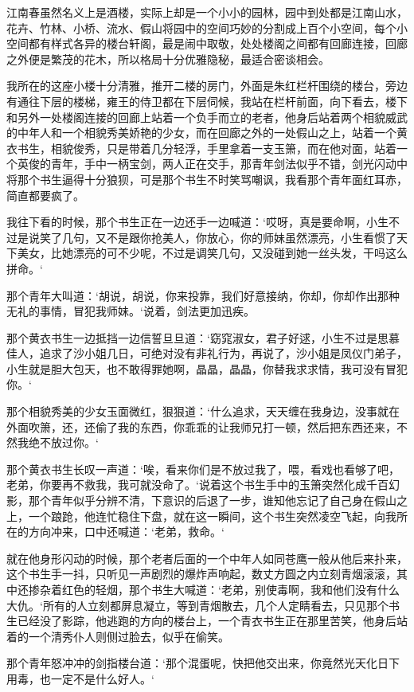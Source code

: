 江南春虽然名义上是酒楼，实际上却是一个小小的园林，园中到处都是江南山水，花卉、竹林、小桥、流水、假山将园中的空间巧妙的分割成上百个小空间，每个小空间都有样式各异的楼台轩阁，最是闹中取敬，处处楼阁之间都有回廊连接，回廊之外便是繁茂的花木，所以格局十分优雅隐秘，最适合密谈相会。

我所在的这座小楼十分清雅，推开二楼的房门，外面是朱红栏杆围绕的楼台，旁边有通往下层的楼梯，雍王的侍卫都在下层伺候，我站在栏杆前面，向下看去，楼下和另外一处楼阁连接的回廊上站着一个负手而立的老者，他身后站着两个相貌威武的中年人和一个相貌秀美娇艳的少女，而在回廊之外的一处假山之上，站着一个黄衣书生，相貌俊秀，只是带着几分轻浮，手里拿着一支玉箫，而在他对面，站着一个英俊的青年，手中一柄宝剑，两人正在交手，那青年剑法似乎不错，剑光闪动中将那个书生逼得十分狼狈，可是那个书生不时笑骂嘲讽，我看那个青年面红耳赤，简直都要疯了。

我往下看的时候，那个书生正在一边还手一边喊道：‘哎呀，真是要命啊，小生不过是说笑了几句，又不是跟你抢美人，你放心，你的师妹虽然漂亮，小生看惯了天下美女，比她漂亮的可不少呢，不过是调笑几句，又没碰到她一丝头发，干吗这么拼命。‘

那个青年大叫道：‘胡说，胡说，你来投靠，我们好意接纳，你却，你却作出那种无礼的事情，冒犯我师妹。‘说着，剑法更加迅疾。

那个黄衣书生一边抵挡一边信誓旦旦道：‘窈窕淑女，君子好逑，小生不过是思慕佳人，追求了沙小姐几日，可绝对没有非礼行为，再说了，沙小姐是凤仪门弟子，小生就是胆大包天，也不敢得罪她啊，晶晶，晶晶，你替我求求情，我可没有冒犯你。‘

那个相貌秀美的少女玉面微红，狠狠道：‘什么追求，天天缠在我身边，没事就在外面吹箫，还，还偷了我的东西，你乖乖的让我师兄打一顿，然后把东西还来，不然我绝不放过你。‘

那个黄衣书生长叹一声道：‘唉，看来你们是不放过我了，喂，看戏也看够了吧，老弟，你要再不救我，我可就没命了。‘说着这个书生手中的玉箫突然化成千百幻影，那个青年似乎分辨不清，下意识的后退了一步，谁知他忘记了自己身在假山之上，一个踉跄，他连忙稳住下盘，就在这一瞬间，这个书生突然凌空飞起，向我所在的方向冲来，口中还喊道：‘老弟，救命。‘

就在他身形闪动的时候，那个老者后面的一个中年人如同苍鹰一般从他后来扑来，这个书生手一抖，只听见一声剧烈的爆炸声响起，数丈方圆之内立刻青烟滚滚，其中还掺杂着红色的轻烟，那个书生大喊道：‘老弟，别使毒啊，我和他们没有什么大仇。‘所有的人立刻都屏息凝立，等到青烟散去，几个人定睛看去，只见那个书生已经没了影踪，他逃跑的方向的楼台上，一个青衣书生正在那里苦笑，他身后站着的一个清秀仆人则侧过脸去，似乎在偷笑。

那个青年怒冲冲的剑指楼台道：‘那个混蛋呢，快把他交出来，你竟然光天化日下用毒，也一定不是什么好人。‘

